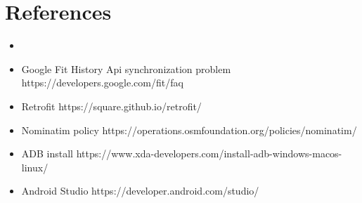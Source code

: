 \section{References}

\begin{itemize}
\item 
\item Google Fit History Api synchronization problem https://developers.google.com/fit/faq
\item Retrofit https://square.github.io/retrofit/
\item Nominatim policy https://operations.osmfoundation.org/policies/nominatim/
\item ADB install https://www.xda-developers.com/install-adb-windows-macos-linux/
\item Android Studio https://developer.android.com/studio/
\end{itemize}